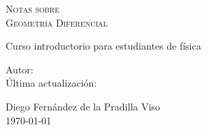 \begin{center}
    \vspace*{2cm}
    \fontsize{20.74}{10}\selectfont
    \textsc{
        Notas sobre\\[10pt]
        Geometría Diferencial
    }

    \hrulefill
    
    \vspace{10pt}
    {\fontsize{14.4}{15}\selectfont
    Curso introductorio para estudiantes de física}

\end{center}
\vspace{1cm}
\begin{minipage}[t]{0.37\textwidth}
    \begin{flushright}
        Autor: \\[5pt]
        Última actualización:
    \end{flushright}
\end{minipage}
\hspace{0.3cm}
\begin{minipage}[t]{0.45\textwidth}
    \begin{flushleft}
        Diego Fernández de la Pradilla Viso \\[5pt]
        \today
    \end{flushleft}
\end{minipage}

\vfill
\begingroup
\hypersetup{hidelinks} 
\tableofcontents
\endgroup